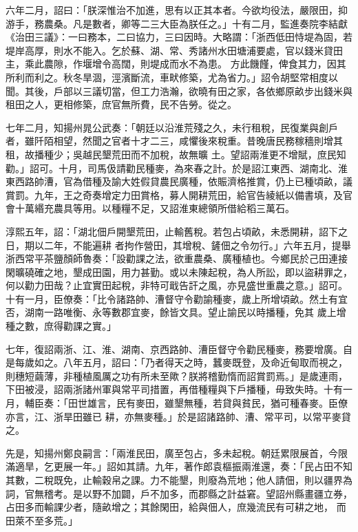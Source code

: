 \begin{pinyinscope}
 六年二月，詔曰：「朕深惟治不加進，思有以正其本者。今欲均役法，嚴限田，抑游手，務農桑。凡是數者，卿等二三大臣為朕任之。」十有二月，監進奏院李結獻《治田三議》：一曰務本，二曰協力，三曰因時。大略謂：「浙西低田恃堤為固，若堤岸高厚，則水不能入。乞於蘇、湖、常、秀諸州水田塘浦要處，官以錢米貸田主，乘此農隙，作堰增令高闊，則堤成而水不為患。
 方此饑饉，俾食其力，因其所利而利之。秋冬旱涸，涇濱斷流，車畎修築，尤為省力。」詔令胡堅常相度以聞。其後，戶部以三議切當，但工力浩瀚，欲曉有田之家，各依鄉原畝步出錢米與租田之人，更相修築，庶官無所費，民不告勞。從之。



 七年二月，知揚州晁公武奏：「朝廷以沿淮荒殘之久，未行租稅，民復業與創戶者，雖阡陌相望，然聞之官者十才二三，咸懼後來稅重。昔晚唐民務稼穡則增其租，故播種少；吳越民墾荒田而不加稅，故無曠
 土。望詔兩淮更不增賦，庶民知勸。」詔可。十月，司馬伋請勸民種麥，為來春之計。於是詔江東西、湖南北、淮東西路帥漕，官為借種及諭大姓假貸農民廣種，依賑濟格推賞，仍上已種頃畝，議賞罰。九年，王之奇奏增定力田賞格，募人開耕荒田，給官告綾紙以備書填，及官會十萬緡充農具等用。以種糧不足，又詔淮東總領所借給稻三萬石。



 淳熙五年，詔：「湖北佃戶開墾荒田，止輸舊稅。若包占頃畝，未悉開耕，詔下之日，期以二年，不能遍耕
 者拘作營田，其增稅、鏟佃之令勿行。」六年五月，提舉浙西常平茶鹽顏師魯奏：「設勸課之法，欲重農桑、廣種植也。今鄉民於己田連接閑曠磽確之地，墾成田園，用力甚勤。或以未陳起稅，為人所訟，即以盜耕罪之，何以勸力田哉？止宜實田起稅，非特可戢告訐之風，亦見盛世重農之意。」詔可。十有一月，臣僚奏：「比令諸路帥、漕督守令勸諭種麥，歲上所增頃畝。然土有宜否，湖南一路唯衡、永等數郡宜麥，餘皆文具。望止諭民以時播種，免其
 歲上增種之數，庶得勸課之實。」



 七年，復詔兩浙、江、淮、湖南、京西路帥、漕臣督守令勸民種麥，務要增廣。自是每歲如之。八年五月，詔曰：「乃者得天之時，蠶麥既登，及命近甸取而視之，則穗短繭薄，非種植風厲之功有所未至歟？朕將稽勤惰而詔賞罰焉。」是歲連雨，下田被浸，詔兩浙諸州軍與常平司措置，再借種糧與下戶播種，毋致失時。十有一月，輔臣奏：「田世雄言，民有麥田，雖墾無種，若貸與貧民，猶可種春麥。臣僚亦言，江、浙旱田雖已
 耕，亦無麥種。」於是詔諸路帥、漕、常平司，以常平麥貸之。



 先是，知揚州鄭良嗣言：「兩淮民田，廣至包占，多未起稅。朝廷累限展首，今限滿適旱，乞更展一年。」詔如其請。九年，著作郎袁樞振兩淮還，奏：「民占田不知其數，二稅既免，止輸穀帛之課。力不能墾，則廢為荒地；他人請佃，則以疆界為詞，官無稽考。是以野不加闢，戶不加多，而郡縣之計益窘。望詔州縣畫疆立券，占田多而輸課少者，隨畝增之；其餘閑田，給與佃人，庶幾流民有可耕之地，
 而田萊不至多荒。」




\end{pinyinscope}
